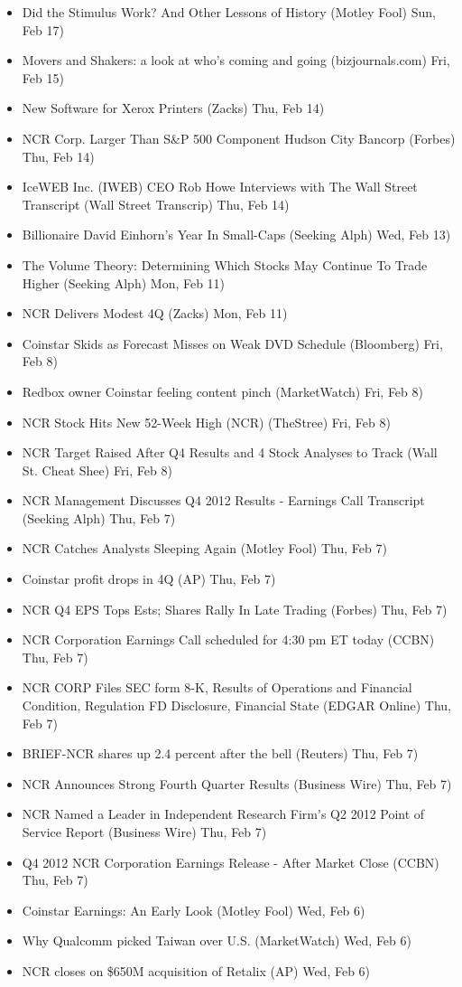 \documentclass[11pt,asymmetric]{article}
\begin{document}
\begin{itemize}
\item Did the Stimulus Work? And Other Lessons of History (Motley Fool) Sun, Feb 17)
\item Movers and Shakers: a look at who’s coming and going (bizjournals.com) Fri, Feb 15)
\item New Software for Xerox Printers (Zacks) Thu, Feb 14)
\item NCR Corp. Larger Than S\&P 500 Component Hudson City Bancorp (Forbes) Thu, Feb 14)
\item IceWEB Inc. (IWEB) CEO Rob Howe Interviews with The Wall Street Transcript (Wall Street Transcrip) Thu, Feb 14)
\item Billionaire David Einhorn's Year In Small-Caps (Seeking Alph) Wed, Feb 13)
\item The Volume Theory: Determining Which Stocks May Continue To Trade Higher (Seeking Alph) Mon, Feb 11)
\item NCR Delivers Modest 4Q (Zacks) Mon, Feb 11)
\item Coinstar Skids as Forecast Misses on Weak DVD Schedule (Bloomberg) Fri, Feb 8)
\item Redbox owner Coinstar feeling content pinch (MarketWatch) Fri, Feb 8)
\item NCR Stock Hits New 52-Week High (NCR) (TheStree) Fri, Feb 8)
\item NCR Target Raised After Q4 Results and 4 Stock Analyses to Track (Wall St. Cheat Shee) Fri, Feb 8)
\item NCR Management Discusses Q4 2012 Results - Earnings Call Transcript (Seeking Alph) Thu, Feb 7)
\item NCR Catches Analysts Sleeping Again (Motley Fool) Thu, Feb 7)
\item Coinstar profit drops in 4Q (AP) Thu, Feb 7)
\item NCR Q4 EPS Tops Ests; Shares Rally In Late Trading (Forbes) Thu, Feb 7)
\item NCR Corporation Earnings Call scheduled for 4:30 pm ET today (CCBN) Thu, Feb 7)
\item NCR CORP Files SEC form 8-K, Results of Operations and Financial Condition, Regulation FD Disclosure, Financial State (EDGAR Online) Thu, Feb 7)
\item BRIEF-NCR shares up 2.4 percent after the bell (Reuters) Thu, Feb 7)
\item NCR Announces Strong Fourth Quarter Results (Business Wire) Thu, Feb 7)
\item NCR Named a Leader in Independent Research Firm’s Q2 2012 Point of Service Report (Business Wire) Thu, Feb 7)
\item Q4 2012 NCR Corporation Earnings Release - After Market Close (CCBN) Thu, Feb 7)
\item Coinstar Earnings: An Early Look (Motley Fool) Wed, Feb 6)
\item Why Qualcomm picked Taiwan over U.S. (MarketWatch) Wed, Feb 6)
\item NCR closes on \$650M acquisition of Retalix (AP) Wed, Feb 6)
\end{itemize}
\end{document}
